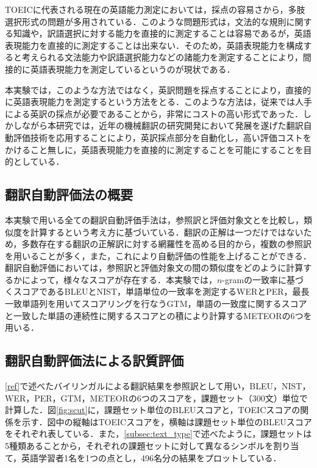\documentclass[japanese]{jnlp_1.4}
\begin{document}
TOEICに代表される現在の英語能力測定においては，採点の容易さから，多肢選択形式の問題が多用されている．このような問題形式は，文法的な規則に関する知識や，訳語選択に対する能力を直接的に測定することは容易であるが，英語表現能力を直接的に測定することは出来ない．そのため，英語表現能力を構成すると考えられる文法能力や訳語選択能力などの諸能力を測定することにより，間接的に英語表現能力を測定しているというのが現状である．

本実験では，このような方法ではなく，英訳問題を採点することにより，直接的に英語表現能力を測定するという方法をとる．このような方法は，従来では人手による英訳の採点が必要であることから，非常にコストの高い形式であった．しかしながら本研究では，近年の機械翻訳の研究開発において発展を遂げた翻訳自動評価技術を応用することにより，英訳採点部分を自動化し，高い評価コストをかけること無しに，英語表現能力を直接的に測定することを可能にすることを目的としている．


\subsection{翻訳自動評価法の概要}
\label{subsec:auto_summary}

本実験で用いる全ての翻訳自動評価手法は，参照訳と評価対象文とを比較し，類似度を計算するという考え方に基づいている．翻訳の正解は一つだけではないため，多数存在する翻訳の正解訳に対する網羅性を高める目的から，複数の参照訳を用いることが多く，また，これにより自動評価の性能を上げることができる．翻訳自動評価においては，参照訳と評価対象文の間の類似度をどのように計算するかによって，様々なスコアが存在する．本実験では，$n$-gramの一致率に基づくスコアであるBLEUとNIST，単語単位の一致率を測定するWERとPER，最長一致単語列を用いてスコアリングを行なうGTM，単語の一致度に関するスコアと一致した単語の連続性に関するスコアとの積により計算するMETEORの6つ\cite{yasuda_ai_08,gtm}を用いる．


\subsection{翻訳自動評価法による訳質評価}\label{subsec:auto}

\ref{ref}で述べたバイリンガルによる翻訳結果を参照訳として用い，BLEU，NIST，WER，PER，GTM，METEORの6つのスコアを，課題セット（300文）単位で計算した．図\ref{fig:scut}に，課題セット単位のBLEUスコアと，TOEICスコアの関係を示す．図中の縦軸はTOEICスコアを，横軸は課題セット単位のBLEUスコアをそれぞれ表している．また，\ref{subsec:text_type}で述べたように，課題セットは5種類あることから，それぞれの課題セットに対して異なるシンボルを割り当て，英語学習者1名を1つの点とし，496名分の結果をプロットしている．
\end{document}
